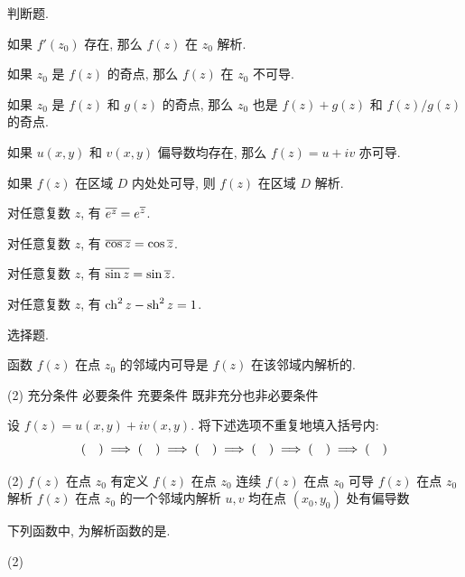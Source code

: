 \begin{homework}
  \item 判断题.
    \begin{exlist}
      \item 如果 $f'(z_0)$ 存在, 那么 $f(z)$ 在 $z_0$ 解析.\fillbrace{}
      \item 如果 $z_0$ 是 $f(z)$ 的奇点, 那么 $f(z)$ 在 $z_0$ 不可导.\fillbrace{}
      \item 如果 $z_0$ 是 $f(z)$ 和 $g(z)$ 的奇点, 那么 $z_0$ 也是 $f(z)+g(z)$ 和 $f(z)/g(z)$ 的奇点.\fillbrace{}
      \item 如果 $u(x,y)$ 和 $v(x,y)$ 偏导数均存在, 那么 $f(z)=u+iv$ 亦可导.\fillbrace{}
      \item 如果 $f(z)$ 在区域 $D$ 内处处可导, 则 $f(z)$ 在区域 $D$ 解析. \fillbrace{}
      \item 对任意复数 $z$, 有 $\overline{e^z}=e^{\overline z}$.\fillbrace{}
      \item 对任意复数 $z$, 有 $\overline{\cos z}=\cos{\overline z}$.\fillbrace{}
      \item 对任意复数 $z$, 有 $\overline{\sin z}=\sin{\overline z}$.\fillbrace{}
      \item 对任意复数 $z$, 有 $\operatorname{ch}^2z-\operatorname{sh}^2z=1$.\fillbrace{}
    \end{exlist}
  \item 选择题.
    \begin{exlist}
      \item 函数 $f(z)$ 在点 $z_0$ 的邻域内可导是 $f(z)$ 在该邻域内解析的\fillbrace{}.
        \begin{taskschoice}(2)
          \task 充分条件
          \task 必要条件
          \task 充要条件
          \task 既非充分也非必要条件
        \end{taskschoice}
      \item 设 $f(z)=u(x,y)+iv(x,y)$. 将下述选项不重复地填入括号内:
      \[\fillbrace{}\implies
        \fillbrace{}\implies
        \fillbrace{}\implies
        \fillbrace{}\implies
        \fillbrace{}\implies
        \fillbrace{}\]
        \begin{taskschoice}(2)
          \task $f(z)$ 在点 $z_0$ 有定义
          \task $f(z)$ 在点 $z_0$ 连续
          \task $f(z)$ 在点 $z_0$ 可导
          \task $f(z)$ 在点 $z_0$ 解析
          \task $f(z)$ 在点 $z_0$ 的一个邻域内解析
          \task $u,v$ 均在点 $(x_0,y_0)$ 处有偏导数
        \end{taskschoice}
      \item 下列函数中, 为解析函数的是\fillbrace{}.
        \begin{taskschoice}(2)

\end{taskschoice}
\end{exlist}
\end{homework}

